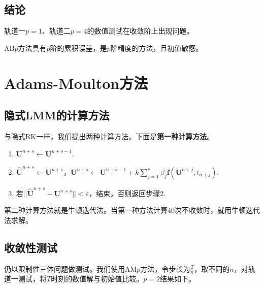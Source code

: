 \documentclass[lang=cn,10pt,bibend=bibtex]{elegantbook}
\begin{document}
\subsection{结论}

轨道一$p=1$、轨道二$p=4$的数值测试在收敛阶上出现问题。

AB$p$方法具有$p$阶的累积误差，是$p$阶精度的方法，且初值敏感。

\vspace{-1.3em}
\section{Adams-Moulton方法}

\subsection{隐式LMM的计算方法}

与隐式RK一样，我们提出两种计算方法。下面是\textbf{第一种计算方法}。

\begin{enumerate}[itemindent=1em]
  \item $\mathbf{U}^{n+s}\gets \mathbf{U}^{n+s-1}$.
  \item $\hat{\mathbf{U}}^{n+s}\gets \mathbf{U}^{n+s}$，$\mathbf{U}^{n+s}\gets \mathbf{U}^{n+s-1}+k\sum\limits_{j=1}^s\beta_j\mathbf{f}(\mathbf{U}^{n+j},t_{n+j})$.
  \item 若$||\hat{\mathbf{U}}^{n+s}-\mathbf{U}^{n+s}|| < \varepsilon$，结束，否则返回步骤2.
\end{enumerate}

第二种计算方法就是牛顿迭代法。当第一种方法计算40次不收敛时，就用牛顿迭代法求解。

\subsection{收敛性测试}

仍以限制性三体问题做测试。我们使用AM$p$方法，令步长为$\frac{T}{n}$，取不同的$n$，对轨道一测试，将$T$时刻的数值解与初始值比较。$p=2$结果如下。
\end{document}
